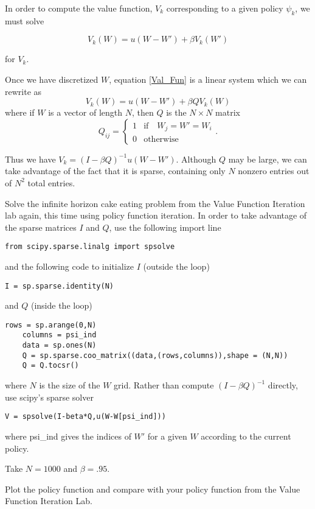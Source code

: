 In order to compute the value function, $V_k$ corresponding to a given policy $\psi_k$, we must solve

\begin{equation}\label{Val_Fun}
V_k(W) = u(W-W') + \beta V_k(W')
\end{equation}

for $V_k$.

Once we have discretized $W$, equation \eqref{Val_Fun} is a linear system which we can rewrite as
\begin{equation}\label{linear}
V_k(W) = u(W-W') + \beta QV_k(W)
\end{equation}
where if $W$ is a vector of length $N$, then $Q$ is the $N\times N$ matrix
\begin{equation}
Q_{ij} = \left\{
     \begin{array}{lr}
       1 & \text{if} \quad  W_j = W' = W_i\\
       0 & \text{otherwise}
     \end{array}
   \right. .
\end{equation}

Thus we have $V_k = (I-\beta Q)^{-1}u(W-W')$.  Although $Q$ may be large, we can take advantage of the fact that it is sparse, containing only $N$ nonzero entries out of $N^2$ total entries.

\begin{problem}
Solve the infinite horizon cake eating problem from the Value Function Iteration lab again, this time using policy function iteration.  In order to take advantage of the sparse matrices $I$ and $Q$, use the following import line

\begin{lstlisting}[style=python]
  from scipy.sparse.linalg import spsolve
\end{lstlisting}

and the following code to initialize $I$ (outside the loop)
\begin{lstlisting}[style=python]
I = sp.sparse.identity(N)
\end{lstlisting}

 and $Q$ (inside the loop)
\begin{lstlisting}[style=python]
    rows = sp.arange(0,N)
    columns = psi_ind
    data = sp.ones(N)
    Q = sp.sparse.coo_matrix((data,(rows,columns)),shape = (N,N))
    Q = Q.tocsr()
\end{lstlisting}

where $N$ is the size of the $W$ grid.  Rather than compute $(I-\beta Q)^{-1}$ directly, use scipy's sparse solver

\begin{lstlisting}[style=python]
V = spsolve(I-beta*Q,u(W-W[psi_ind]))
\end{lstlisting}

where psi\_ind gives the indices of $W'$ for a given $W$ according to the current policy.  

Take $N = 1000$ and $\beta = .95$.

Plot the policy function and compare with your policy function from the Value Function Iteration Lab.
\end{problem}

